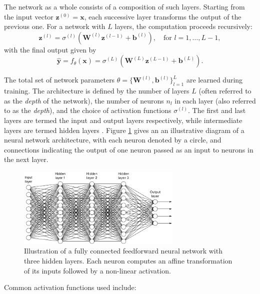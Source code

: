 The network as a whole consists of a composition of such layers. Starting from the input 
vector \( \mathbf{z}^{(0)} = \mathbf{x} \), each successive layer transforms the output of the previous
one. For a network with \( L \) layers, the computation proceeds recursively:
\[
    \mathbf{z}^{(l)} = \sigma^{(l)}\left( \mathbf{W}^{(l)} \mathbf{z}^{(l-1)} + \mathbf{b}^{(l)} 
    \right), \quad \text{for } l = 1, \dots, L-1,
\]
with the final output given by
\[
    \hat{\mathbf{y}} = f_\theta(\mathbf{x}) = \sigma^{(L)}(\mathbf{W}^{(L)} \mathbf{z}^{(L-1)} + 
    \mathbf{b}^{(L)}).
\]

The total set of network parameters \( \theta = \{ \mathbf{W}^{(l)}, \mathbf{b}^{(l)} \}_{l=1}^L \) 
are learned during training. The architecture is defined by the number of layers \( L \) (often 
referred to as the \textit{depth} of the network), the number 
of neurons \( n_l \) in each layer (also referred to as the \textit{depth}), and the choice of 
activation functions \( \sigma^{(l)} \). The first and last layers are termed the input and output 
layers respectively, while intermediate 
layers are termed hidden layers \cite{goodfellow2016deep}. 
Figure \ref{fig:nn-architecture} gives an an illustrative diagram of 
a neural network architecture, with each neuron denoted by a circle, and connections indicating the
output of one neuron passed as an input to neurons in the next layer.

\begin{figure}[h]
    \centering
    \includegraphics[width=0.7\textwidth]{graphics/neural_network_image.png}
    \caption{Illustration of a fully connected feedforward neural network with three hidden layers. 
    Each neuron computes an affine transformation of its inputs followed by a non-linear activation.}
    \label{fig:nn-architecture}
\end{figure}


Common activation functions used include:

